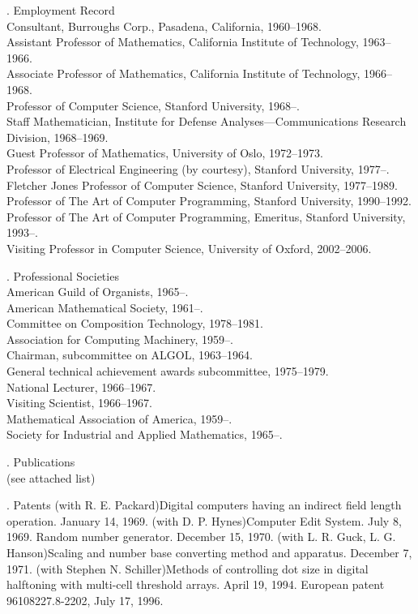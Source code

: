 . {Employment Record}
\\Consultant, Burroughs Corp., Pasadena, California, 1960--1968.
\\Assistant Professor of Mathematics, California Institute of Technology,
1963--1966.
\\Associate Professor of Mathematics, California Institute of Technology,
1966--1968.
\\Professor of Computer Science, Stanford University, 1968--.
\\Staff Mathematician, Institute for Defense Analyses---Communications Research
Division, 1968--1969.
\\Guest Professor of Mathematics, University of Oslo, 1972--1973.
\\Professor of Electrical Engineering (by courtesy),
 Stanford University, 1977--.
\\Fletcher Jones Professor of Computer Science,
 Stanford University, 1977--1989.
\\Professor of The Art of Computer Programming,
 Stanford University, 1990--1992.
\\Professor of The Art of Computer Programming, Emeritus,
 Stanford University, 1993--.
\\Visiting Professor in Computer Science, University of Oxford, 2002--2006.

. {Professional Societies}
\\American Guild of Organists, 1965--.
\\American Mathematical Society, 1961--.
\\\indent Committee on Composition Technology, 1978--1981.
\\Association for Computing Machinery, 1959--.
\\\indent Chairman, subcommittee on ALGOL, 1963--1964.
\\\indent General technical achievement awards subcommittee, 1975--1979.
\\\indent National Lecturer, 1966--1967.
\\\indent Visiting Scientist, 1966--1967.
\\Mathematical Association of America, 1959--.
\\Society for Industrial and Applied Mathematics, 1965--.

. {Publications}
\\(see attached list)

. {Patents}
 (with R. E. Packard)\xskip Digital computers having an indirect
 field length operation. January 14, 1969.
\yskip
{} (with D. P. Hynes)\xskip Computer Edit System. July 8, 1969.
\yskip
{} Random number generator.  December 15, 1970.
\yskip
{} (with L. R. Guck, L. G. Hanson)\xskip Scaling and number base
 converting method and apparatus.  December 7, 1971.
\yskip
{} (with Stephen N. Schiller)\xskip Methods of controlling dot size
 in digital halftoning with multi-cell threshold arrays. April 19, 1994.
 European patent 96108227.8-2202, July 17, 1996.

